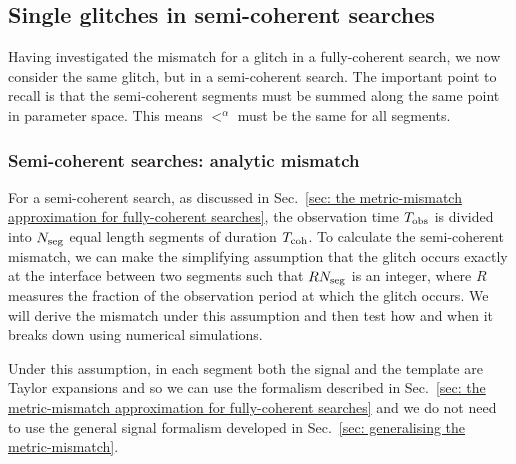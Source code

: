 \documentclass[../full_thesis/full_thesis.tex]{subfiles}
\begin{document}
\subsection{Single glitches in semi-coherent searches}

Having investigated the mismatch for a glitch in a fully-coherent search, we now
consider the same glitch, but in a semi-coherent search. The important point
to recall is that the semi-coherent segments must be summed along the same
point in parameter space. This means $\lt^{\alpha}$ must be the same for all segments.

\subsubsection{Semi-coherent searches: analytic mismatch}
\label{sec: semi-coherent searches: analytic mismatch}

For a semi-coherent search, as discussed in Sec.~\ref{sec: the metric-mismatch
approximation for fully-coherent searches}, the observation time $T_{\mathrm{obs}}$ is
divided into $N_{\textrm{seg}}$ equal length segments of duration $T_{\mathrm{coh}}$. To calculate
the semi-coherent mismatch, we can make the simplifying assumption that the
glitch occurs exactly at the interface between two segments such that $RN_{\textrm{seg}}$
is an integer, where $R$ measures the fraction of the observation period at
which the glitch occurs. We will derive the mismatch under this assumption and
then test how and when it breaks down using numerical simulations.

Under this assumption, in each segment both the signal and the template are
Taylor expansions and so we can use the \citet{Brady1998} formalism described
in Sec.~\ref{sec: the metric-mismatch approximation for fully-coherent
searches} and we do not need to use the general signal formalism developed in
Sec.~\ref{sec: generalising the metric-mismatch}.
\end{document}

